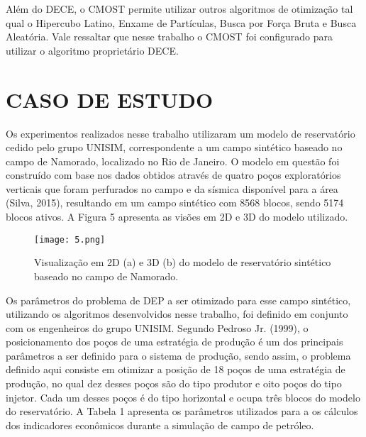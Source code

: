 Além do DECE, o CMOST permite utilizar outros algoritmos de otimização tal qual o Hipercubo Latino, Enxame de Partículas, Busca por Força Bruta e Busca Aleatória. Vale ressaltar que nesse trabalho o CMOST foi configurado para utilizar o algoritmo proprietário DECE.

\section{CASO DE ESTUDO}

Os experimentos realizados nesse trabalho utilizaram um modelo de reservatório cedido pelo grupo UNISIM, correspondente a um campo sintético baseado no campo de Namorado, localizado no Rio de Janeiro. O modelo em questão foi construído com base nos dados obtidos através de quatro poços exploratórios verticais que foram perfurados no campo e da sísmica disponível para a área (Silva, 2015), resultando em um campo sintético com 8568 blocos, sendo 5174 blocos ativos. A Figura 5 apresenta as visões em 2D e 3D do modelo utilizado.

\begin{figure}[htb]

\texttt{[image: 5.png]}

\caption{Visualização em 2D (a) e 3D (b) do modelo de reservatório sintético baseado no campo de Namorado.}


\end{figure}

Os parâmetros do problema de DEP a ser otimizado para esse campo sintético, utilizando os algoritmos desenvolvidos nesse trabalho, foi definido em conjunto com os engenheiros do grupo UNISIM. Segundo Pedroso Jr. (1999), o posicionamento dos poços de uma estratégia de produção é um dos principais parâmetros a ser definido para o sistema de produção, sendo assim, o problema definido aqui consiste em otimizar a posição de 18 poços de uma estratégia de produção, no qual dez desses poços são do tipo produtor e oito poços do tipo injetor. Cada um desses poços é do tipo horizontal e ocupa três blocos do modelo do reservatório. A Tabela 1 apresenta os parâmetros utilizados para a os cálculos dos indicadores econômicos durante a simulação de campo de petróleo.

